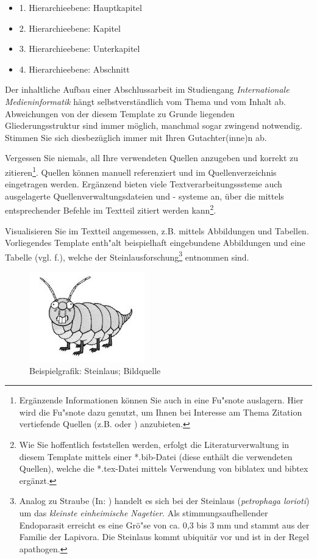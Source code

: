 \documentclass[oneside,bibliography=totocnumbered,BCOR=5mm]{scrbook}%
\theoremstyle{definition}
\theoremstyle{definition}
\theoremstyle{definition}
\theoremstyle{definition}
\theoremstyle{definition}
\theoremstyle{definition}
\begin{document}
\begin{itemize}
\item 1. Hierarchieebene: Hauptkapitel
\item 2. Hierarchieebene: Kapitel
\item 3. Hierarchieebene: Unterkapitel
\item 4. Hierarchieebene: Abschnitt
\end{itemize}

Der inhaltliche Aufbau einer Abschlussarbeit im Studiengang
\textit{Internationale Medieninformatik} h\"angt selbstverst\"andlich vom Thema und vom Inhalt ab. Abweichungen von der diesem Template zu Grunde liegenden Gliederungsstruktur sind immer m\"oglich, manchmal sogar zwingend notwendig. Stimmen Sie sich diesbez\"uglich immer mit Ihren Gutachter(inne)n ab.


Vergessen Sie niemals, all Ihre verwendeten Quellen anzugeben und korrekt zu zitieren\footnote{Erg\"anzende Informationen k\"onnen Sie auch in eine Fu"snote auslagern. Hier wird die Fu"snote dazu genutzt, um Ihnen bei Interesse am Thema Zitation vertiefende Quellen (z.B. \autocite{balzert2011} oder \autocite{franck2013}) anzubieten.}. Quellen k\"onnen manuell referenziert und im Quellenverzeichnis eingetragen werden. Erg\"anzend bieten viele Textverarbeitungsssteme auch ausgelagerte Quellenverwaltungsdateien und - systeme an,  \"uber die mittels entsprechender Befehle im Textteil zitiert werden kann\footnote{Wie Sie hoffentlich feststellen werden, erfolgt die Literaturverwaltung in diesem Template mittels einer *.bib-Datei (diese enth\"alt die verwendeten Quellen), welche die *.tex-Datei mittels Verwendung von biblatex und bibtex erg\"anzt.}.

Visualisieren Sie im Textteil angemessen, z.B. mittels Abbildungen und Tabellen. Vorliegendes Template enth"alt beispielhaft eingebundene Abbildungen und eine Tabelle (vgl. f.), welche der Steinlausforschung\footnote{Analog zu Straube (In: \autocite{pschy}) handelt es sich bei der Steinlaus (\textit{petrophaga lorioti}) um das \frqq \textit{kleinste einheimische Nagetier}\flqq. Als stimmungsaufhellender Endoparasit erreicht es eine Gr\"o"se von ca. 0,3 bis 3 mm und stammt aus der Familie der Lapivora. Die Steinlaus kommt ubiquit\"ar vor und ist in der Regel apathogen.} entnommen sind.


\begin{figure}
\centering
\includegraphics{steinlaus.jpg}
  \caption{Beispielgrafik: Steinlaus; Bildquelle \autocite{loriot}}
\end{figure}
\end{document}
